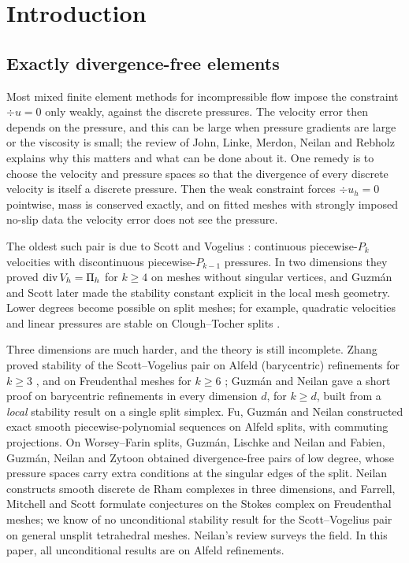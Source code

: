 \section{Introduction}\label{sec:intro}

\subsection{Exactly divergence-free elements}
Most mixed finite element methods for incompressible flow impose the constraint $\div u=0$ only weakly, against the discrete pressures. The velocity error then depends on the pressure, and this can be large when pressure gradients are large or the viscosity is small; the review of John, Linke, Merdon, Neilan and Rebholz \cite{JohnEtAl2017} explains why this matters and what can be done about it. One remedy is to choose the velocity and pressure spaces so that the divergence of every discrete velocity is itself a discrete pressure. Then the weak constraint forces $\div u_h=0$ pointwise, mass is conserved exactly, and on fitted meshes with strongly imposed no-slip data the velocity error does not see the pressure.

The oldest such pair is due to Scott and Vogelius \cite{ScottVogelius1985}: continuous piecewise-$P_k$ velocities with discontinuous piecewise-$P_{k-1}$ pressures. In two dimensions they proved $\operatorname{div}V_h=\Pi_h$ for $k\ge4$ on meshes without singular vertices, and Guzm\'an and Scott \cite{GuzmanScott2019} later made the stability constant explicit in the local mesh geometry. Lower degrees become possible on split meshes; for example, quadratic velocities and linear pressures are stable on Clough--Tocher splits \cite{ArnoldQin1992}.

Three dimensions are much harder, and the theory is still incomplete. Zhang proved stability of the Scott--Vogelius pair on Alfeld (barycentric) refinements for $k\ge3$ \cite{Zhang2005}, and on Freudenthal meshes for $k\ge6$ \cite{Zhang2011}; Guzm\'an and Neilan \cite{GuzmanNeilan2018} gave a short proof on barycentric refinements in every dimension $d$, for $k\ge d$, built from a \emph{local} stability result on a single split simplex. Fu, Guzm\'an and Neilan \cite{FuGuzmanNeilan2020} constructed exact smooth piecewise-polynomial sequences on Alfeld splits, with commuting projections. On Worsey--Farin splits, Guzm\'an, Lischke and Neilan \cite{GuzmanLischkeNeilan2022} and Fabien, Guzm\'an, Neilan and Zytoon \cite{FabienGuzmanNeilanZytoon2022} obtained divergence-free pairs of low degree, whose pressure spaces carry extra conditions at the singular edges of the split. Neilan \cite{Neilan2015} constructs smooth discrete de Rham complexes in three dimensions, and Farrell, Mitchell and Scott \cite{FarrellMitchellScott2024} formulate conjectures on the Stokes complex on Freudenthal meshes; we know of no unconditional stability result for the Scott--Vogelius pair on general unsplit tetrahedral meshes. Neilan's review \cite{Neilan2020} surveys the field. In this paper, all unconditional results are on Alfeld refinements.


